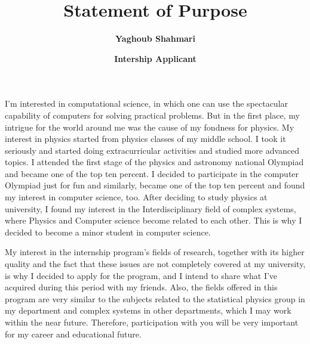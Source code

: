 \documentclass{article}
\title{\textbf{Statement of Purpose}}
\author{\textbf{Yaghoub Shahmari}}
\date{\textbf{Intership Applicant}}
\begin{document}
  \maketitle%

  I'm interested in computational science, in which one can use the spectacular capability of computers for solving practical problems. But in the first place, my intrigue for the world around me was the cause of my fondness for physics. My interest in physics started from physics classes of my middle school. I took it seriously and started doing extracurricular activities and studied more advanced topics. I attended the first stage of the physics and astronomy national Olympiad and became one of the top ten percent. I decided to participate in the computer Olympiad just for fun and similarly, became one of the top ten percent and found my interest in computer science, too. After deciding to study physics at university, I found my interest in the Interdisciplinary field of complex systems, where Physics and Computer science become related to each other. This is why I decided to become a minor student in computer science.
  
  My interest in the internship program's fields of research, together with its higher quality and the fact that these issues are not completely covered at my university, is why I decided to apply for the program, and I intend to share what I've acquired during this period with my friends. Also, the fields offered in this program are very similar to the subjects related to the statistical physics group in my department and complex systems in other departments, which I may work within the near future. Therefore, participation with you will be very important for my career and educational future.
\end{document}
